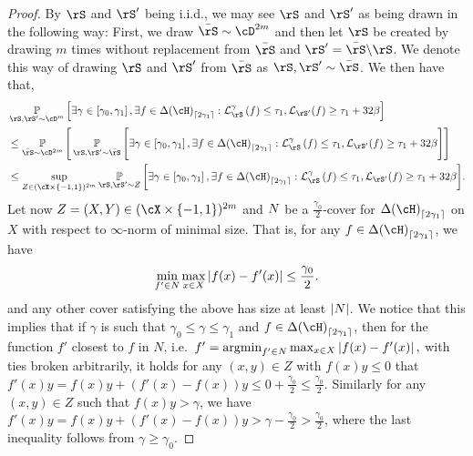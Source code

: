 \begin{proof}
By $ \rS $ and $ \rS' $ being i.i.d., we may see $ \rS $ and $ \rS' $ as being drawn in the following way: First, we draw $ \bar{\rS}\sim \cD^{2m} $ and then let $ \rS $ be created by drawing $ m $ times without replacement from $ \bar{\rS} $ and $ \rS'=\bar{\rS}\backslash\rS $.  We denote this way of drawing $ \rS $ and $ \rS' $ from $ \bar{\rS} $ as  $ \rS,\rS'\sim \bar{\rS} $. We then have that,
   \begin{align}\label{eq:marginbound14}
    &\p_{\rS,\rS'\sim\cD^{m}}\left[\exists \gamma \in \left[\gamma_{0},\gamma_{1}\right],\exists f\in \dlh_{\left\lceil2\gamma_{1}\right\rceil} :  \ls_{\rS}^{\gamma}\left(f\right)
    \leq \tau_{1}, \ls_{\rS'}(f) \geq 
    \tau_{1} 
        + 32\beta\right]
    \\
    &\leq
    \p_{\bar{\rS}\sim \cD^{2m}}\Bigg[\p_{\rS,\rS'\sim\bar{\rS}}\Bigg[\exists \gamma \in \left[\gamma_{0},\gamma_{1}\right],\exists f\in \dlh_{\left\lceil2\gamma_{1}\right\rceil} :  \ls_{\rS}^{\gamma}\left(f\right)
    \leq \tau_{1}, \ls_{\rS'}(f) \geq 
    \tau_{1} 
        + 32\beta\Bigg]\Bigg]\nonumber
    \\
    &\leq
    \sup_{Z\in (\cX\times\{  -1,1\}) ^{2m}}
    \p_{\rS,\rS'\sim Z}\bigg[\exists \gamma \in \left[\gamma_{0},\gamma_{1}\right],\exists f\in \dlh_{\left\lceil2\gamma_{1}\right\rceil} :  \ls_{\rS}^{\gamma}\left(f\right)
    \leq \tau_{1}, \ls_{\rS'}(f) \geq 
    \tau_{1} 
        + 32\beta\bigg].\nonumber
   \end{align}
   Let now $ Z=(X,Y)\in (\cX\times\{  -1,1\}) ^{2m} $ and $ N $ be a $ \frac{\gamma_{0}}{2} $-cover for $ \dlh_{\left\lceil2\gamma_{1}\right\rceil} $ on $ X $   with respect to $ \infty $-norm of minimal size. That is, for any $ f\in \dlh_{\left\lceil2\gamma_{1}\right\rceil} $, we have
   \begin{align*}
    \min_{f'\in N}\max_{x\in X}  \left| f(x)-f'(x) \right| \leq \frac{\gamma_{0}}{2}.
   \end{align*}  
   and any other cover satisfying the above has size at least $|N|$. 
   We notice that this implies that if $ \gamma $ is such that $
   \gamma_{0}\leq\gamma\leq\gamma_{1} $ and $ f\in
   \dlh_{\left\lceil2\gamma_{1}\right\rceil} $, then for the function
   $f'$ closest to $ f $ in $N$, i.e.\ $f'=\text{argmin}_{f'\in N
   }\max_{x\in X}  \left| f(x)-f'(x) \right|,$ with ties broken
   arbitrarily, it holds for any $ (x,y)\in Z$ with $ f(x)y\leq0 $ that$ f'(x)y=f(x)y+(f'(x)-f(x))y\leq0+\frac{\gamma_{0}}{2} \leq \frac{\gamma_{0}}{2}$. 
   Similarly for any $ (x,y)\in Z $ such that $ f(x)y> \gamma $, we have $ f'(x)y=f(x)y+(f'(x)-f(x))y>\gamma-\frac{\gamma_{0}}{2} >\frac{\gamma_{0}}{2}$, where the last inequality follows from $ \gamma\geq \gamma_{0}$. 

\end{proof}

